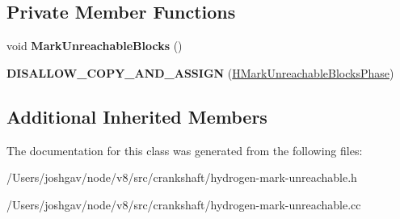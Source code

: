\subsection*{Private Member Functions}
\begin{DoxyCompactItemize}
\item 
void {\bfseries Mark\+Unreachable\+Blocks} ()\hypertarget{classv8_1_1internal_1_1_h_mark_unreachable_blocks_phase_afc08a875570f4d8bb4c5495923e82d08}{}\label{classv8_1_1internal_1_1_h_mark_unreachable_blocks_phase_afc08a875570f4d8bb4c5495923e82d08}

\item 
{\bfseries D\+I\+S\+A\+L\+L\+O\+W\+\_\+\+C\+O\+P\+Y\+\_\+\+A\+N\+D\+\_\+\+A\+S\+S\+I\+GN} (\hyperlink{classv8_1_1internal_1_1_h_mark_unreachable_blocks_phase}{H\+Mark\+Unreachable\+Blocks\+Phase})\hypertarget{classv8_1_1internal_1_1_h_mark_unreachable_blocks_phase_a2c14fbfb8e5b91af9439b33473eb0fc0}{}\label{classv8_1_1internal_1_1_h_mark_unreachable_blocks_phase_a2c14fbfb8e5b91af9439b33473eb0fc0}

\end{DoxyCompactItemize}
\subsection*{Additional Inherited Members}


The documentation for this class was generated from the following files\+:\begin{DoxyCompactItemize}
\item 
/\+Users/joshgav/node/v8/src/crankshaft/hydrogen-\/mark-\/unreachable.\+h\item 
/\+Users/joshgav/node/v8/src/crankshaft/hydrogen-\/mark-\/unreachable.\+cc\end{DoxyCompactItemize}
